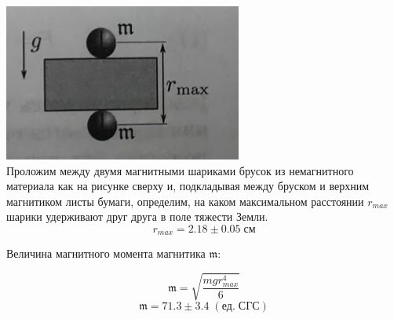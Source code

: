 \documentclass[a4paper,12pt]{article}
\begin{document}
\begin{center}
\begin{minipage}{0.4\textwidth}
 \includegraphics[width=\linewidth]{1.jpg}\\
Проложим между двумя магнитными шариками брусок из немагнитного материала как на рисунке сверху и, подкладывая между бруском и верхним магнитиком листы бумаги, определим, на каком максимальном расстоянии $r_{max}$ шарики удерживают друг друга в поле тяжести Земли. \[r_{max} = 2.18 \pm 0.05 \; {см}\]

Величина магнитного момента магнитика $\mathfrak{m}$:

\[ \mathfrak{m} = \sqrt{\frac{mgr^4_{max}}{6}} \]
\[ \mathfrak{m} = 71.3 \pm 3.4 \; (ед.\; СГС) \]


\end{minipage}
\end{center}
\end{document}
